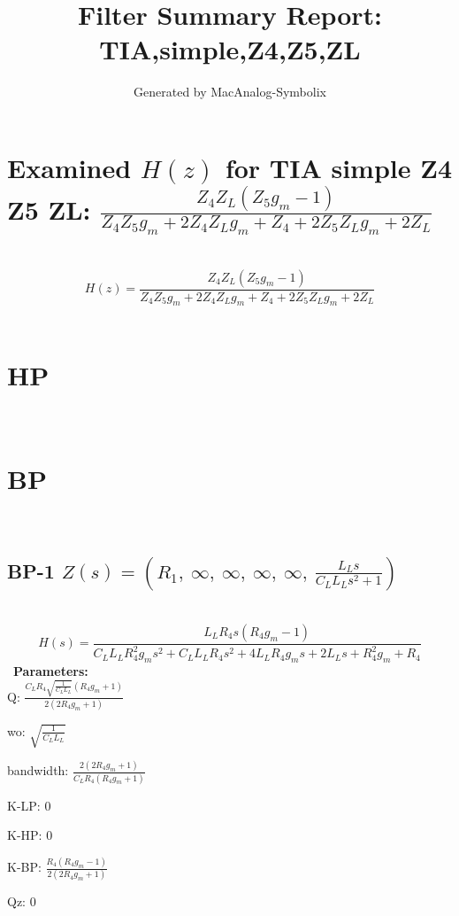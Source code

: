\documentclass{article}
\begin{document}
        
                        \title{Filter Summary Report: TIA,simple,Z4,Z5,ZL}
                        \author{Generated by MacAnalog-Symbolix}
                        \maketitle

                        \tableofcontents
                        \newpage
                        \section{Examined $H(z)$ for TIA simple Z4 Z5 ZL: $\frac{Z_{4} Z_{L} \left(Z_{5} g_{m} - 1\right)}{Z_{4} Z_{5} g_{m} + 2 Z_{4} Z_{L} g_{m} + Z_{4} + 2 Z_{5} Z_{L} g_{m} + 2 Z_{L}}$ }\ 
\textbf{\[H(z) = \frac{Z_{4} Z_{L} \left(Z_{5} g_{m} - 1\right)}{Z_{4} Z_{5} g_{m} + 2 Z_{4} Z_{L} g_{m} + Z_{4} + 2 Z_{5} Z_{L} g_{m} + 2 Z_{L}}\] }\ 
\section{HP}\ 
\section{BP}\ 
\subsection{BP-1 $Z(s) = \left( R_{1}, \  \infty, \  \infty, \  \infty, \  \infty, \  \frac{L_{L} s}{C_{L} L_{L} s^{2} + 1}\right)$ } \ 
\textbf{\[H(s) = \frac{L_{L} R_{4} s \left(R_{4} g_{m} - 1\right)}{C_{L} L_{L} R_{4}^{2} g_{m} s^{2} + C_{L} L_{L} R_{4} s^{2} + 4 L_{L} R_{4} g_{m} s + 2 L_{L} s + R_{4}^{2} g_{m} + R_{4}}\] } \ 
\textbf{Parameters:}\\ 

Q: $\frac{C_{L} R_{4} \sqrt{\frac{1}{C_{L} L_{L}}} \left(R_{4} g_{m} + 1\right)}{2 \left(2 R_{4} g_{m} + 1\right)}$\ 

wo: $\sqrt{\frac{1}{C_{L} L_{L}}}$\ 

bandwidth: $\frac{2 \left(2 R_{4} g_{m} + 1\right)}{C_{L} R_{4} \left(R_{4} g_{m} + 1\right)}$\ 

K-LP: $0$\ 

K-HP: $0$\ 

K-BP: $\frac{R_{4} \left(R_{4} g_{m} - 1\right)}{2 \left(2 R_{4} g_{m} + 1\right)}$\ 

Qz: $0$\ 
\end{document}
